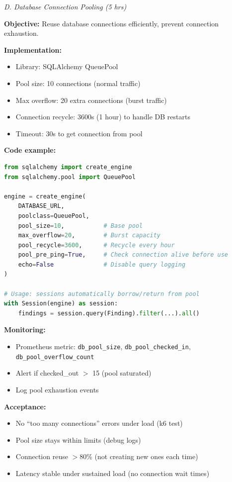 \documentclass[11pt,a4paper]{article}
\begin{document}
\textit{D. Database Connection Pooling (5 hrs)}

\textbf{Objective:} Reuse database connections efficiently, prevent connection exhaustion.

\textbf{Implementation:}
\begin{itemize}[leftmargin=*]
    \item Library: SQLAlchemy QueuePool
    \item Pool size: 10 connections (normal traffic)
    \item Max overflow: 20 extra connections (burst traffic)
    \item Connection recycle: 3600s (1 hour) to handle DB restarts
    \item Timeout: 30s to get connection from pool
\end{itemize}

\textbf{Code example:}
\begin{lstlisting}[language=Python]
from sqlalchemy import create_engine
from sqlalchemy.pool import QueuePool

engine = create_engine(
    DATABASE_URL,
    poolclass=QueuePool,
    pool_size=10,           # Base pool
    max_overflow=20,        # Burst capacity
    pool_recycle=3600,      # Recycle every hour
    pool_pre_ping=True,     # Check connection alive before use
    echo=False              # Disable query logging
)

# Usage: sessions automatically borrow/return from pool
with Session(engine) as session:
    findings = session.query(Finding).filter(...).all()
\end{lstlisting}

\textbf{Monitoring:}
\begin{itemize}[leftmargin=*]
    \item Prometheus metric: \texttt{db\_pool\_size}, \texttt{db\_pool\_checked\_in}, \texttt{db\_pool\_overflow\_count}
    \item Alert if checked\_out $>$ 15 (pool saturated)
    \item Log pool exhaustion events
\end{itemize}

\textbf{Acceptance:}
\begin{itemize}[leftmargin=*]
    \item[$\checkmark$] No ``too many connections'' errors under load (k6 test)
    \item[$\checkmark$] Pool size stays within limits (debug logs)
    \item[$\checkmark$] Connection reuse $>$80\% (not creating new ones each time)
    \item[$\checkmark$] Latency stable under sustained load (no connection wait times)
\end{itemize}
\end{document}
